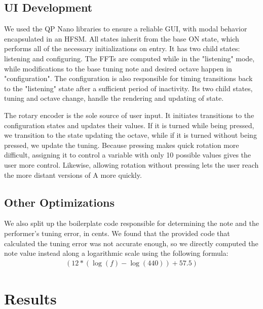 \documentclass{article}
\begin{document}
\subsection{UI Development}
We used the QP Nano libraries to ensure a reliable GUI, with modal behavior encapsulated in an HFSM. All states inherit from the base ON state, which performs all of the necessary initializations on entry. It has two child states: listening and configuring. The FFTs are computed while in the "listening" mode, while modifications to the base tuning note and desired octave happen in "configuration". The configuration is also responsible for timing transitions back to the "listening" state after a sufficient period of inactivity. Its two child states, tuning and octave change, handle the rendering and updating of state.  

The rotary encoder is the sole source of user input. It initiates transitions to the configuration states and updates their values. If it is turned while being pressed, we transition to the state updating the octave, while if it is turned without being pressed, we update the tuning. Because pressing makes quick rotation more difficult, assigning it to control a variable with only 10 possible values gives the user more control. Likewise, allowing rotation without pressing lets the user reach the more distant versions of A more quickly.  

\subsection{Other Optimizations}
We also split up the boilerplate code responsible for determining the note and the performer's tuning error, in cents. We found that the provided code that calculated the tuning error was not accurate enough, so we directly computed the note value instead along a logarithmic scale using the following formula:
\begin{align}
(12*(\log (f) - \log(440))+57.5) %
\end{align}

\section{Results} 
\end{document}
